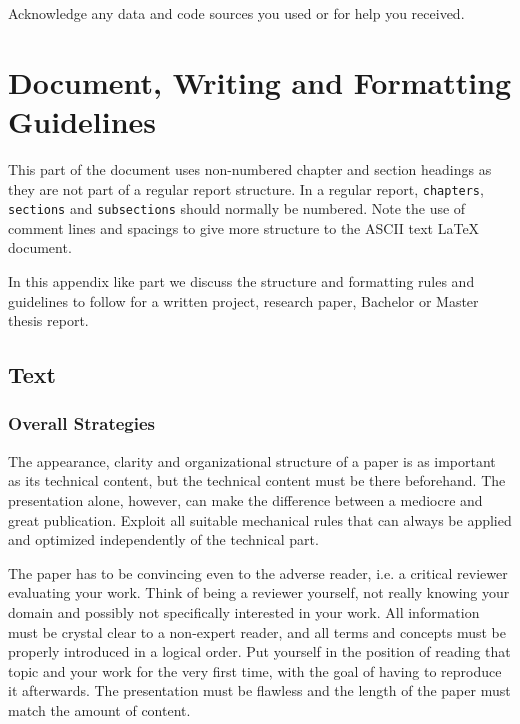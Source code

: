 \documentclass[11pt, a4paper,oneside,chapterprefix=false]{scrbook}
\begin{document}
Acknowledge any data and code sources you used or for help you received.


\chapter*{Document, Writing and Formatting Guidelines}

This part of the document uses non-numbered chapter and section headings as they are not part of a regular report structure. In a regular report, \texttt{chapters}, \texttt{sections} and \texttt{subsections} should normally be numbered. Note the use of comment lines and spacings to give more structure to the ASCII text LaTeX document.

In this appendix like part we discuss the structure and formatting rules and guidelines to follow for a written project, research paper, Bachelor or Master thesis report.

\section*{Text} \label{sec:text}

\subsection*{Overall Strategies}

The appearance, clarity and organizational structure of a paper is as important as its technical content, but the technical content must be there beforehand. The presentation alone, however, can make the difference between a mediocre and great publication. Exploit all suitable mechanical rules that can always be applied and optimized independently of the technical part.

The paper has to be convincing even to the adverse reader, i.e. a critical reviewer evaluating your work. Think of being a reviewer yourself, not really knowing your domain and possibly not specifically interested in your work. All information must be crystal clear to a non-expert reader, and all terms and concepts must be properly introduced in a logical order. Put yourself in the position of reading that topic and your work for the very first time, with the goal of having to reproduce it afterwards. The presentation must be flawless and the length of the paper must match the amount of content.
\end{document}
